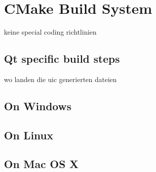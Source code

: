 
\section{CMake Build System}
keine special coding richtlinien

\subsection{Qt specific build steps}
wo landen die uic generierten dateien

\subsection{On Windows}


\subsection{On Linux}

\subsection{On Mac OS X} 
